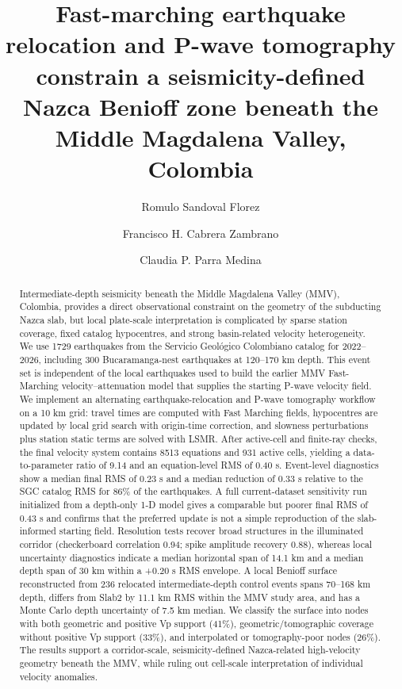 \documentclass[review,authoryear]{elsarticle}
\begin{document}
\begin{frontmatter}

\title{Fast-marching earthquake relocation and P-wave tomography constrain a seismicity-defined Nazca Benioff zone beneath the Middle Magdalena Valley, Colombia}

\author[inst1]{Romulo Sandoval Florez}
\author[inst2]{Francisco H. Cabrera Zambrano}
\author[inst3]{Claudia P. Parra Medina}


\address[inst1]{Universidad ECCI, Bogot\'a, Colombia}
\address[inst2]{Grupo de Investigaci\'on PANGEA, Universidad de Pamplona, Colombia}
\address[inst3]{Universidad Militar Nueva Granada, Bogot\'a, Colombia}

\begin{abstract}
Intermediate-depth seismicity beneath the Middle Magdalena Valley (MMV), Colombia, provides a direct observational constraint on the geometry of the subducting Nazca slab, but local plate-scale interpretation is complicated by sparse station coverage, fixed catalog hypocentres, and strong basin-related velocity heterogeneity. We use 1729 earthquakes from the Servicio Geol\'ogico Colombiano catalog for 2022--2026, including 300 Bucaramanga-nest earthquakes at 120--170 km depth. This event set is independent of the local earthquakes used to build the earlier MMV Fast-Marching velocity--attenuation model that supplies the starting P-wave velocity field. We implement an alternating earthquake-relocation and P-wave tomography workflow on a 10 km grid: travel times are computed with Fast Marching fields, hypocentres are updated by local grid search with origin-time correction, and slowness perturbations plus station static terms are solved with LSMR. After active-cell and finite-ray checks, the final velocity system contains 8513 equations and 931 active cells, yielding a data-to-parameter ratio of 9.14 and an equation-level RMS of 0.40 s. Event-level diagnostics show a median final RMS of 0.23 s and a median reduction of 0.33 s relative to the SGC catalog RMS for 86\% of the earthquakes. A full current-dataset sensitivity run initialized from a depth-only 1-D model gives a comparable but poorer final RMS of 0.43 s and confirms that the preferred update is not a simple reproduction of the slab-informed starting field. Resolution tests recover broad structures in the illuminated corridor (checkerboard correlation 0.94; spike amplitude recovery 0.88), whereas local uncertainty diagnostics indicate a median horizontal span of 14.1 km and a median depth span of 30 km within a +0.20 s RMS envelope. A local Benioff surface reconstructed from 236 relocated intermediate-depth control events spans 70--168 km depth, differs from Slab2 by 11.1 km RMS within the MMV study area, and has a Monte Carlo depth uncertainty of 7.5 km median. We classify the surface into nodes with both geometric and positive Vp support (41\%), geometric/tomographic coverage without positive Vp support (33\%), and interpolated or tomography-poor nodes (26\%). The results support a corridor-scale, seismicity-defined Nazca-related high-velocity geometry beneath the MMV, while ruling out cell-scale interpretation of individual velocity anomalies.

\end{abstract}
\end{frontmatter}
\end{document}
